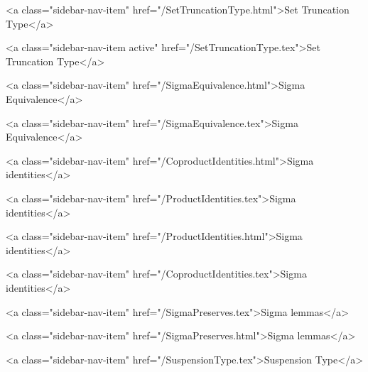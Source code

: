       
        
          <a class="sidebar-nav-item" href="/SetTruncationType.html">Set Truncation Type</a>
        
      
    
      
        
          <a class="sidebar-nav-item active" href="/SetTruncationType.tex">Set Truncation Type</a>
        
      
    
      
        
          <a class="sidebar-nav-item" href="/SigmaEquivalence.html">Sigma Equivalence</a>
        
      
    
      
        
          <a class="sidebar-nav-item" href="/SigmaEquivalence.tex">Sigma Equivalence</a>
        
      
    
      
        
          <a class="sidebar-nav-item" href="/CoproductIdentities.html">Sigma identities</a>
        
      
    
      
        
          <a class="sidebar-nav-item" href="/ProductIdentities.tex">Sigma identities</a>
        
      
    
      
        
          <a class="sidebar-nav-item" href="/ProductIdentities.html">Sigma identities</a>
        
      
    
      
        
          <a class="sidebar-nav-item" href="/CoproductIdentities.tex">Sigma identities</a>
        
      
    
      
        
          <a class="sidebar-nav-item" href="/SigmaPreserves.tex">Sigma lemmas</a>
        
      
    
      
        
          <a class="sidebar-nav-item" href="/SigmaPreserves.html">Sigma lemmas</a>
        
      
    
      
        
          <a class="sidebar-nav-item" href="/SuspensionType.tex">Suspension Type</a>
        
